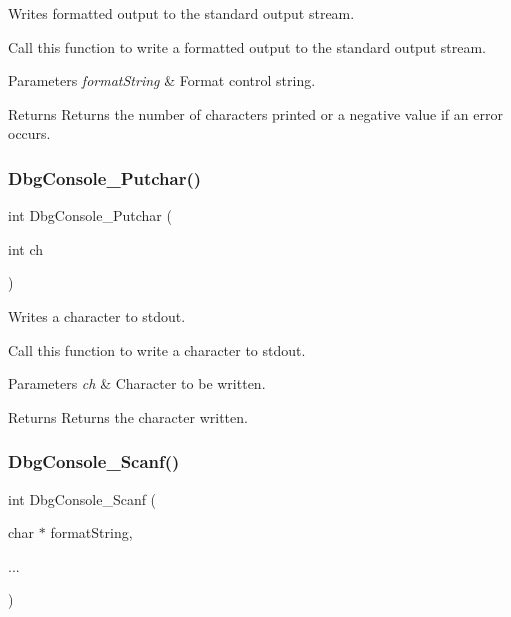 Writes formatted output to the standard output stream. 

Call this function to write a formatted output to the standard output stream.


\begin{DoxyParams}{Parameters}
{\em format\+String} & Format control string. \\
\hline
\end{DoxyParams}
\begin{DoxyReturn}{Returns}
Returns the number of characters printed or a negative value if an error occurs. 
\end{DoxyReturn}
\mbox{\label{group__debugconsole_gada572d86a06f028b5b1a5d0440f683e3}} 
\subsubsection{\texorpdfstring{DbgConsole\_Putchar()}{DbgConsole\_Putchar()}}
{\footnotesize\ttfamily int Dbg\+Console\+\_\+\+Putchar (\begin{DoxyParamCaption}\item[{int}]{ch }\end{DoxyParamCaption})}



Writes a character to stdout. 

Call this function to write a character to stdout.


\begin{DoxyParams}{Parameters}
{\em ch} & Character to be written. \\
\hline
\end{DoxyParams}
\begin{DoxyReturn}{Returns}
Returns the character written. 
\end{DoxyReturn}
\mbox{\label{group__debugconsole_ga6d87d10b03e4aaf8464206fe3829dd28}} 
\subsubsection{\texorpdfstring{DbgConsole\_Scanf()}{DbgConsole\_Scanf()}}
{\footnotesize\ttfamily int Dbg\+Console\+\_\+\+Scanf (\begin{DoxyParamCaption}\item[{char $\ast$}]{format\+String,  }\item[{}]{... }\end{DoxyParamCaption})}



